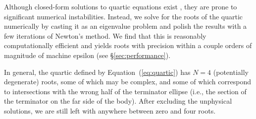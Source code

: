 \documentclass[modern]{aastex62}
\begin{document}
%
Although closed-form solutions to quartic equations exist
\citep[see, e.g.,][who solve for the area of overlap between two ellipses
    analytically]{Hughes2011}, they are prone to significant numerical
instabilities. Instead, we solve for the roots of the quartic
numerically by casting it
as an eigenvalue problem \citep[e.g.,][]{Edelman1995} and polish the
results with a few iterations of Newton's method. We find that this is
reasonably computationally efficient and
yields roots with precision within a couple orders of magnitude of machine
epsilon (see \S\ref{sec:performance}).

In general, the quartic defined by Equation~(\ref{eq:quartic}) has
$N=4$ (potentially degenerate) roots, some of which may be complex, and some
of which correspond to intersections with the wrong half of the
terminator ellipse (i.e., the section of the terminator on the far side
of the body). After excluding the unphysical solutions, we are still left with
anywhere between zero and four roots.

\end{document}
